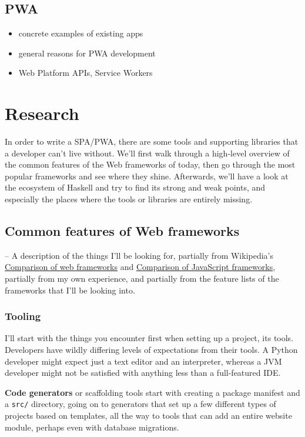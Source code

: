 \documentclass[english,odsaz]{fitthesis}
\begin{document}
\section{PWA}
\label{sec:org08c60c8}
\begin{itemize}
\item concrete examples of existing apps
\item general reasons for PWA development
\item Web Platform APIs, Service Workers
\end{itemize}

\chapter{Research}
\label{sec:org711ec91}
In order to write a SPA/PWA, there are some tools and supporting libraries that
a developer can't live without. We'll first walk through a high-level overview
of the common features of the Web frameworks of today, then go through the most
popular frameworks and see where they shine. Afterwards, we'll have a look at
the ecosystem of Haskell and try to find its strong and weak points, and
especially the places where the tools or libraries are entirely missing.

\section{Common features of Web frameworks}
\label{sec:org5b63cff}
-- A description of the things I'll be looking for, partially from
Wikipedia's \href{https://en.wikipedia.org/wiki/Comparison\_of\_web\_frameworks}{Comparison of web frameworks} and \href{https://en.wikipedia.org/wiki/Comparison\_of\_JavaScript\_frameworks}{Comparison of JavaScript
frameworks}, partially from my own experience, and partially from the feature
lists of the frameworks that I'll be looking into.

\subsection{Tooling}
\label{sec:orgcc8ef1c}
I'll start with the things you encounter first when setting up a project, its
tools. Developers have wildly differing levels of expectations from their tools. A
Python developer might expect just a text editor and an interpreter, whereas a
JVM developer might not be satisfied with anything less than a full-featured IDE.

\textbf{Code generators} or scaffolding tools start with creating a package manifest and
a \texttt{src/} directory, going on to generators that set up a few different types of
projects based on templates, all the way to tools that can add an entire website
module, perhaps even with database migrations.
\end{document}
